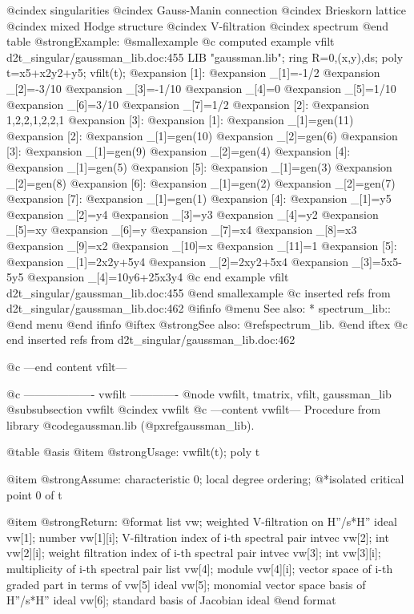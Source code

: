 @cindex singularities
@cindex Gauss-Manin connection
@cindex Brieskorn lattice
@cindex mixed Hodge structure
@cindex V-filtration
@cindex spectrum
@end table
@strong{Example:}
@smallexample
@c computed example vfilt d2t_singular/gaussman_lib.doc:455 
LIB "gaussman.lib";
ring R=0,(x,y),ds;
poly t=x5+x2y2+y5;
vfilt(t);
@expansion{} [1]:
@expansion{}    _[1]=-1/2
@expansion{}    _[2]=-3/10
@expansion{}    _[3]=-1/10
@expansion{}    _[4]=0
@expansion{}    _[5]=1/10
@expansion{}    _[6]=3/10
@expansion{}    _[7]=1/2
@expansion{} [2]:
@expansion{}    1,2,2,1,2,2,1
@expansion{} [3]:
@expansion{}    [1]:
@expansion{}       _[1]=gen(11)
@expansion{}    [2]:
@expansion{}       _[1]=gen(10)
@expansion{}       _[2]=gen(6)
@expansion{}    [3]:
@expansion{}       _[1]=gen(9)
@expansion{}       _[2]=gen(4)
@expansion{}    [4]:
@expansion{}       _[1]=gen(5)
@expansion{}    [5]:
@expansion{}       _[1]=gen(3)
@expansion{}       _[2]=gen(8)
@expansion{}    [6]:
@expansion{}       _[1]=gen(2)
@expansion{}       _[2]=gen(7)
@expansion{}    [7]:
@expansion{}       _[1]=gen(1)
@expansion{} [4]:
@expansion{}    _[1]=y5
@expansion{}    _[2]=y4
@expansion{}    _[3]=y3
@expansion{}    _[4]=y2
@expansion{}    _[5]=xy
@expansion{}    _[6]=y
@expansion{}    _[7]=x4
@expansion{}    _[8]=x3
@expansion{}    _[9]=x2
@expansion{}    _[10]=x
@expansion{}    _[11]=1
@expansion{} [5]:
@expansion{}    _[1]=2x2y+5y4
@expansion{}    _[2]=2xy2+5x4
@expansion{}    _[3]=5x5-5y5
@expansion{}    _[4]=10y6+25x3y4
@c end example vfilt d2t_singular/gaussman_lib.doc:455
@end smallexample
@c inserted refs from d2t_singular/gaussman_lib.doc:462
@ifinfo
@menu
See also:
* spectrum_lib::
@end menu
@end ifinfo
@iftex
@strong{See also:}
@ref{spectrum_lib}.
@end iftex
@c end inserted refs from d2t_singular/gaussman_lib.doc:462

@c ---end content vfilt---

@c ------------------- vwfilt -------------
@node vwfilt, tmatrix, vfilt, gaussman_lib
@subsubsection vwfilt
@cindex vwfilt
@c ---content vwfilt---
Procedure from library @code{gaussman.lib} (@pxref{gaussman_lib}).

@table @asis
@item @strong{Usage:}
vwfilt(t); poly t

@item @strong{Assume:}
characteristic 0; local degree ordering;
@*isolated critical point 0 of t

@item @strong{Return:}
@format
list vw;  weighted V-filtration on H''/s*H''
  ideal vw[1];
    number vw[1][i];  V-filtration index of i-th spectral pair
  intvec vw[2];
    int vw[2][i];  weight filtration index of i-th spectral pair
  intvec vw[3];
    int vw[3][i];  multiplicity of i-th spectral pair
  list vw[4];
    module vw[4][i];  vector space of i-th graded part in terms of vw[5]
  ideal vw[5];  monomial vector space basis of H''/s*H''
  ideal vw[6];  standard basis of Jacobian ideal
@end format

